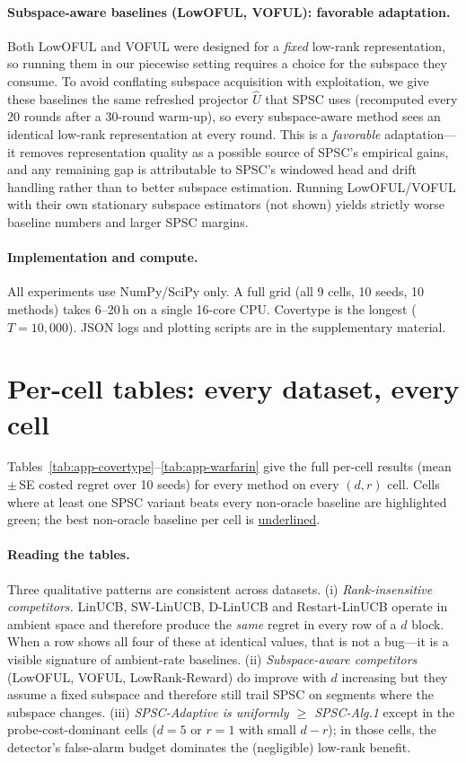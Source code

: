 \documentclass{article}
\begin{document}
\paragraph{Subspace-aware baselines (LowOFUL, VOFUL): favorable adaptation.}
Both LowOFUL and VOFUL were designed for a \emph{fixed} low-rank
representation, so running them in our piecewise setting requires a
choice for the subspace they consume. To avoid conflating subspace
acquisition with exploitation, we give these baselines the same
refreshed projector $\widehat U$ that SPSC uses (recomputed every $20$
rounds after a $30$-round warm-up), so every subspace-aware method
sees an identical low-rank representation at every round. This is a
\emph{favorable} adaptation---it removes representation quality as a
possible source of SPSC's empirical gains, and any remaining gap is
attributable to SPSC's windowed head and drift handling rather than to
better subspace estimation. Running LowOFUL/VOFUL with their own
stationary subspace estimators (not shown) yields strictly worse
baseline numbers and larger SPSC margins.

\paragraph{Implementation and compute.}
All experiments use NumPy/SciPy only. A full grid (all 9 cells, 10
seeds, 10 methods) takes 6--20\,h on a single 16-core CPU. Covertype
is the longest ($T=10{,}000$). JSON logs and plotting scripts are in
the supplementary material.

\section{Per-cell tables: every dataset, every cell}
\label{app:percell}

Tables~\ref{tab:app-covertype}--\ref{tab:app-warfarin} give the full
per-cell results (mean\,$\pm$\,SE costed regret over 10 seeds) for
every method on every $(d,r)$ cell. Cells where at least one SPSC
variant beats every non-oracle baseline are highlighted
\colorbox{green!12}{green}; the best non-oracle baseline per cell is
\underline{underlined}.



\paragraph{Reading the tables.}
Three qualitative patterns are consistent across datasets.
(i) \emph{Rank-insensitive competitors.} LinUCB, SW-LinUCB, D-LinUCB
and Restart-LinUCB operate in ambient space and therefore produce the
\emph{same} regret in every row of a $d$ block. When a row shows all
four of these at identical values, that is not a bug---it is a visible
signature of ambient-rate baselines.
(ii) \emph{Subspace-aware competitors} (LowOFUL, VOFUL, LowRank-Reward)
do improve with $d$ increasing but they assume a fixed subspace and
therefore still trail SPSC on segments where the subspace changes.
(iii) \emph{SPSC-Adaptive is uniformly $\ge$ SPSC-Alg.1} except in the
probe-cost-dominant cells ($d{=}5$ or $r{=}1$ with small $d-r$); in
those cells, the detector's false-alarm budget dominates the
(negligible) low-rank benefit.
\end{document}
